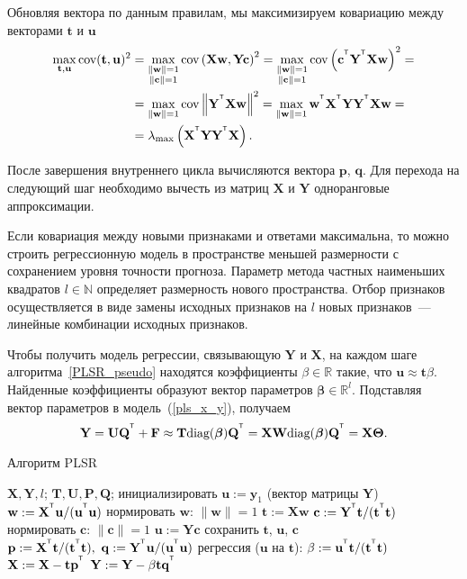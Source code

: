 \documentclass[12pt,twoside]{article}
\newcommand{\by}{\mathbf{y}}
\newcommand{\bw}{\mathbf{w}}
\newcommand{\bY}{\mathbf{Y}}
\newcommand{\bX}{\mathbf{X}}
\newcommand{\bu}{\mathbf{u}}
\newcommand{\bt}{\mathbf{t}}
\newcommand{\bp}{\mathbf{p}}
\newcommand{\bq}{\mathbf{q}}
\newcommand{\bc}{\mathbf{c}}
\newcommand{\bP}{\mathbf{P}}
\newcommand{\bT}{\mathbf{T}}
\newcommand{\bQ}{\mathbf{Q}}
\newcommand{\bF}{\mathbf{F}}
\newcommand{\bU}{\mathbf{U}}
\newcommand{\bW}{\mathbf{W}}
\newcommand{\bTheta}{\boldsymbol{\Theta}}
\begin{document}
Обновляя вектора по данным правилам, мы максимизируем ковариацию между векторами $\bt$ и $\bu$
\begin{align*}
    \max_{\bt, \bu}  \text{cov} (\bt, \bu)^2 &= \max_{\substack{\|\bw\|=1 \\ \|\bc\| = 1}} \text{cov} \left( \bX \bw, \bY \bc \right)^2 = \max_{\substack{\|\bw\|=1 \\ \|\bc\| = 1}} \text{cov} \left(\bc^{\T}  \bY^{\T} \bX \bw \right)^2 = \\
    &= \max_{\|\bw\| = 1} \text{cov} \left\|\bY^{\T} \bX \bw \right\|^2 = \max_{\|\bw\| = 1} \bw^{\T} \bX^{\T} \bY \bY^{\T} \bX \bw = \\
    & = \lambda_{\max} \left( \bX^{\T} \bY \bY^{\T} \bX \right).
\end{align*}

После завершения внутреннего цикла вычисляются вектора $\bp$, $\bq$. Для перехода на следующий шаг необходимо вычесть из матриц $\bX$ и $\bY$ одноранговые аппроксимации.

Если ковариация между новыми признаками и ответами максимальна, то можно строить регрессионную модель в пространстве меньшей размерности с сохранением уровня точности прогноза. Параметр метода частных наименьших квадратов $l \in \mathbb{N}$ определяет размерность нового пространства. Отбор признаков осуществляется в виде замены исходных признаков на $l$ новых признаков~--- линейные комбинации исходных признаков.


Чтобы получить модель регрессии, связывающую $\bY$ и $\bX$, на каждом шаге алгоритма~\ref{PLSR_pseudo} находятся коэффициенты $\beta \in  \mathbb{R}$ такие, что $\bu \approx \bt \beta$. Найденные коэффициенты образуют вектор параметров $\boldsymbol{\beta} \in \mathbb{R}^l$. 
Подставляя вектор параметров в модель~(\ref{pls_x_y}), получаем
$$
    \bY = \bU\bQ^{\T}  + \bF \approx \bT \text{diag}(\boldsymbol{\beta}) \bQ^{\T} = \bX \bW \text{diag}(\boldsymbol{\beta}) \bQ^{\T} = \bX \bTheta.
$$

\begin{center}
\begin{algorithm}[h]
\caption{Алгоритм PLSR}
    \label{PLSR_pseudo}
\begin{algorithmic}[1]
\REQUIRE $\bX, \bY, l$;
\ENSURE $\bT, \bU, \bP, \bQ$;
\STATE инициализировать $\bu := \by_1$ (вектор матрицы $\bY$)
  \REPEAT
    \STATE $\bw := \bX^{\T} \bu / (\bu^{\T} \bu)$
    \STATE нормировать $\bw$: $\| \bw \| = 1$
    \STATE $\mathbf{t} := \bX \bw$
    \STATE $\bc := \bY^{\T} \bt / (\bt^{\T} \bt)$
    \STATE нормировать $\bc$:  $\| \bc \| = 1$
    \STATE $\bu := \bY \bc$
  \UNTIL{$\bt$ не перестанет меняться}
  \STATE сохранить $\bt$, $\bu$, $\bc$
  \STATE $\bp := \bX^{\T}\bt/(\bt^{\T}\bt),\ \bq := \bY^{\T}\bu/(\bu^{\T}\bu)$
  \STATE регрессия ($\bu$ на $\bt$): $\beta := \bu^{\T} \bt / (\bt^{\T} \bt)$ 
  \STATE $\bX := \bX - \bt \bp^{\T}$
  \STATE $\bY := \bY - \beta\bt\bq^{\T}$ 
\ENDFOR
\end{algorithmic}
\end{algorithm}
\end{center}
\end{document}

